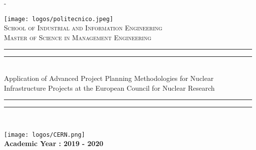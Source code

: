 %
%
% 
%
%
\begin{titlingpage}
\begin{SingleSpace}
\calccentering{\unitlength} 
\begin{adjustwidth*}{\unitlength}{-\unitlength}
\begin{center}
\texttt{[image: logos/politecnico.jpeg]}\\ \vspace{2.5mm}
\vspace*{6mm}
\textsc{\Large School of Industrial and Information Engineering}\\[0.5cm]
\textsc{\Large Master of Science in Management Engineering}\\[0.5cm]
\end{center}
\rule[0.5ex]{\linewidth}{2pt}\vspace*{-\baselineskip}\vspace*{3.2pt}
\rule[0.5ex]{\linewidth}{1pt}\\[\baselineskip]
{\huge Application of Advanced Project Planning Methodologies for Nuclear Infrastructure Projects at the European Council for Nuclear Research }\\[4mm]
\rule[0.5ex]{\linewidth}{1pt}\vspace*{-\baselineskip}\vspace{3.2pt}
\rule[0.5ex]{\linewidth}{2pt}\\
\vspace{2.5mm}
\begin{center}
\texttt{[image: logos/CERN.png]}\\
\vspace{2mm}
\large \textbf{Academic Year : 2019 - 2020}
\vspace{2mm}
\end{center}


\end{adjustwidth*}
\end{SingleSpace}
\end{titlingpage}
